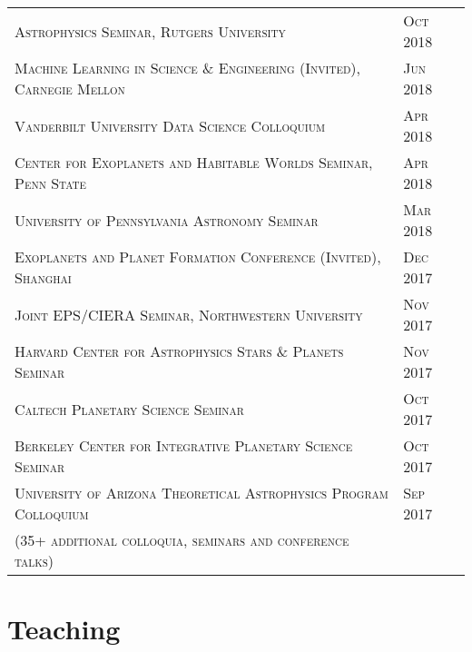 \documentclass[10pt]{article} %
\begin{document}
\begin{tabular}{l>{\hfill}p{2.8cm}}
\textsc{Astrophysics Seminar, Rutgers University} & \textsc{Oct} 2018 \\
\textsc{Machine Learning in Science \& Engineering (Invited), Carnegie Mellon} & \textsc{Jun} 2018 \\
\textsc{Vanderbilt University Data Science Colloquium} & \textsc{Apr} 2018 \\
\textsc{Center for Exoplanets and Habitable Worlds Seminar, Penn State} & \textsc{Apr} 2018 \\
\textsc{University of Pennsylvania Astronomy Seminar} & \textsc{Mar} 2018 \\
\textsc{Exoplanets and Planet Formation Conference (Invited), Shanghai} & \textsc{Dec} 2017 \\
\textsc{Joint EPS/CIERA Seminar, Northwestern University} & \textsc{Nov} 2017 \\
\textsc{Harvard Center for Astrophysics Stars \& Planets Seminar} & \textsc{Nov} 2017 \\
\textsc{Caltech Planetary Science Seminar} & \textsc{Oct} 2017 \\
\textsc{Berkeley Center for Integrative Planetary Science Seminar} & \textsc{Oct} 2017 \\
\textsc{University of Arizona Theoretical Astrophysics Program Colloquium} & \textsc{Sep} 2017 \\
\textsc{(35+ additional colloquia, seminars and conference talks)}
\end{tabular}


\section{Teaching}
\end{document}
